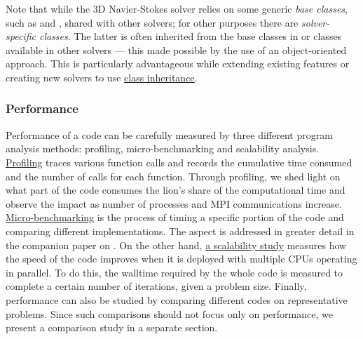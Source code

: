 Note that while the 3D Navier-Stokes solver relies on some generic \emph{base
classes}, such as  and
, shared with other solvers; for other
purposes there are \emph{solver-specific classes}.  The latter is often inherited
from the base classes in  or classes available in other
solvers --- this made possible by the use of an object-oriented approach.  This is
particularly advantageous while extending existing features or creating new
solvers to use
\href{https://docs.python.org/3/tutorial/classes.html#inheritance}{%
class inheritance}.



\subsubsection{Performance}

Performance of a code can be carefully measured by three different program
analysis methods: profiling, micro-benchmarking and scalability analysis.
%
\href{https://en.wikipedia.org/wiki/Profiling_(computer_programming)}{Profiling}
traces various function calls and records the cumulative time consumed and the
number of calls for each function.  Through profiling, we shed light on what
part of the code consumes the lion's share of the computational time and
observe the impact as number of processes and MPI communications increase.
%
\href{https://en.wiktionary.org/wiki/microbenchmark}{Micro-benchmarking} is the
process of timing a specific portion of the code and comparing different
implementations.  The aspect is addressed in greater detail in the companion
paper on  \citep{fluidfft}.
%
On the other hand,
\href{https://en.wikipedia.org/wiki/Scalability#Performance_tuning_versus_hardware_scalability}{a
scalability study} measures how the speed of the code improves when it is deployed
with multiple CPUs operating in parallel.  To do this, the walltime required by
the whole code is measured to complete a certain number of iterations, given a
problem size.
%
Finally, performance can also be studied by comparing different codes on
representative problems. Since such comparisons should not focus only on
performance, we present a comparison study in a separate section.

